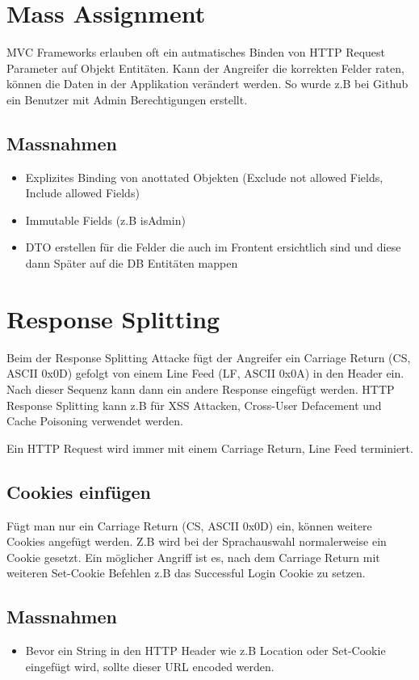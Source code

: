 \section{Mass Assignment}
MVC Frameworks erlauben oft ein autmatisches Binden von HTTP Request Parameter auf Objekt Entitäten. Kann der Angreifer die korrekten Felder raten, können die Daten in der Applikation verändert werden. So wurde z.B bei Github ein Benutzer mit Admin Berechtigungen erstellt.

\subsection{Massnahmen}
\begin{itemize}
	\item Explizites Binding von anottated Objekten (Exclude not allowed Fields, Include allowed Fields)
	\item Immutable Fields (z.B isAdmin)
	\item DTO erstellen für die Felder die auch im Frontent ersichtlich sind und diese dann Später auf die DB Entitäten mappen
\end{itemize}

\section{Response Splitting}
Beim der Response Splitting Attacke fügt der Angreifer ein Carriage Return (CS, ASCII 0x0D) gefolgt von einem Line Feed (LF, ASCII 0x0A) in den Header ein. Nach dieser Sequenz kann dann ein andere Response eingefügt werden. HTTP Response Splitting kann z.B für XSS Attacken, Cross-User Defacement und Cache Poisoning verwendet werden. 

Ein HTTP Request wird immer mit einem Carriage Return, Line Feed terminiert.

\subsection{Cookies einfügen}
Fügt man nur ein Carriage Return (CS, ASCII 0x0D) ein, können weitere Cookies angefügt werden. Z.B wird bei der Sprachauswahl normalerweise ein Cookie gesetzt. Ein möglicher Angriff ist es, nach dem Carriage Return mit weiteren Set-Cookie Befehlen z.B das Successful Login Cookie zu setzen. 

\subsection{Massnahmen}
\begin{itemize}
	\item Bevor ein String in den HTTP Header wie z.B Location oder Set-Cookie eingefügt wird, sollte dieser URL encoded werden.
\end{itemize}

